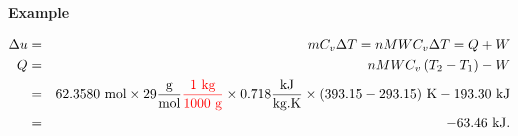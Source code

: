 \begin{MyExample}{\begin{center}{\bf Example}\end{center}}
\begin{enumerate}[(a)]
\begin{eqnarray}
          \Delta u &=& m C_{v}\Delta T = n MW C_{v}\Delta T = Q + W  \nonumber \\
             Q &=& n MW C_{v}\left(T_{2}-T_{1}\right) - W \nonumber \\
               &=& 62.3580\text{ mol}\times 29 \displaystyle\frac{\text{g}}{\text{mol}} \textcolor{red}{\displaystyle\frac{1\text{ kg}}{1000\text{ g}}}\times 0.718\displaystyle\frac{\text{kJ}}{\text{kg.K}}\times (393.15-293.15)\text{ K} - 193.30 \text{ kJ} \nonumber \\
                                                          &=& -63.46\text{ kJ}. \nonumber                   
               \end{eqnarray}
        \end{enumerate}
   \end{MyExample}
   

